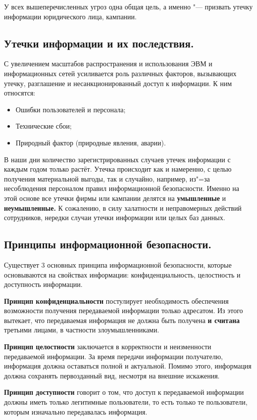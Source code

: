 У всех вышеперечисленных угроз одна общая цель, а именно "--- призвать утечку информации юридического лица, кампании.

\newpage
\subsection{Утечки информации и их последствия.}
С увеличением масштабов распространения и использования ЭВМ и информационных сетей усиливается роль различных факторов, вызывающих утечку, 
разглашение и несанкционированный доступ к информации. К ним относятся:
\begin{itemize}
    \item Ошибки пользователей и персонала;
    \item Технические сбои;
    \item Природный фактор (природные явления, аварии).
\end{itemize}
В наши дни количество зарегистрированных случаев утечек информации с каждым годом только растёт. Утечка происходит как и намеренно, с целью получения
материальной выгоды, так и случайно, например, из"=за несоблюдения персоналом правил информационной безопасности. Именно на этой основе все утечки фирмы или кампании
делятся на \textbf{умышленные} и \textbf{неумышленные.} К сожалению, в силу халатности и неправомерных действий сотрудников, нередки случаи утечки информации или целых
баз данных.

\subsection{Принципы информационной безопасности.}
Существует 3 основных принципа информационной безопасности, которые основываются на свойствах информации: конфиденциальность, целостность и доступность информации.

\textbf{Принцип конфиденциальности} постулирует необходимость обеспечения возможности получения передаваемой информации только адресатом. Из этого вытекает, что передаваемая информация
не должна быть получена \textbf{и считана} третьими лицами, в частности злоумышленниками.

\textbf{Принцип целостности} заключается в корректности и неизменности передаваемой информации. За время передачи информации получателю, информация должна оставаться полной и актуальной.
Помимо этого, информация должна сохранять первозданный вид, несмотря на внешние искажения.

\textbf{Принцип доступности} говорит о том, что доступ к передаваемой информации должны иметь только легитимные пользователи, то есть только те пользователи, которым изначально
передавалась информация.

